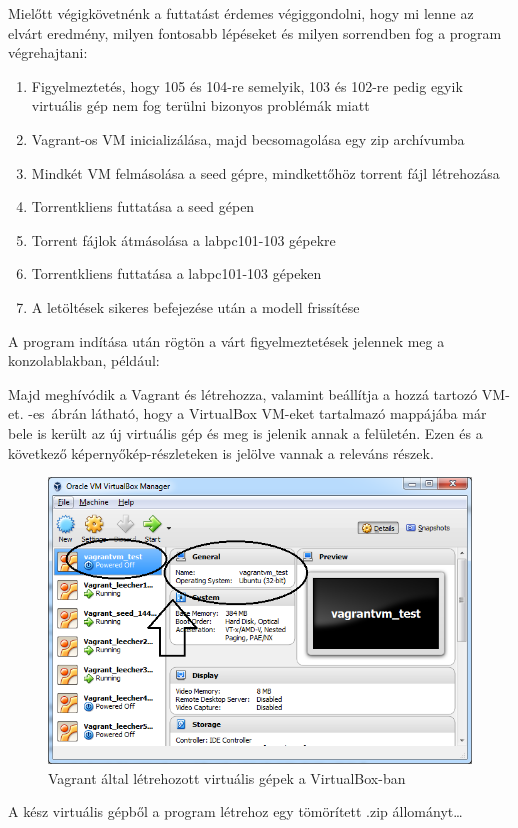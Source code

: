 \FloatBarrier

Mielőtt végigkövetnénk a futtatást érdemes végiggondolni, hogy mi lenne az elvárt eredmény, milyen fontosabb lépéseket és milyen sorrendben fog a program végrehajtani:

\begin{enumerate}
  \item Figyelmeztetés, hogy 105 és 104-re semelyik, 103 és 102-re pedig egyik virtuális gép nem fog terülni bizonyos problémák miatt
  \item Vagrant-os VM inicializálása, majd becsomagolása egy zip archívumba
  \item Mindkét VM felmásolása a seed gépre, mindkettőhöz torrent fájl létrehozása
  \item Torrentkliens futtatása a seed gépen
  \item Torrent fájlok átmásolása a labpc101-103 gépekre
  \item Torrentkliens futtatása a labpc101-103 gépeken
  \item A letöltések sikeres befejezése után a modell frissítése
\end{enumerate}

A program indítása után rögtön a várt figyelmeztetések jelennek meg a konzolablakban, például:


Majd meghívódik a Vagrant és létrehozza, valamint beállítja a hozzá tartozó VM-et. -es~ábrán látható, hogy a VirtualBox VM-eket tartalmazó mappájába már bele is került az új virtuális gép és meg is jelenik annak a felületén. Ezen és a következő képernyőkép-részleteken is jelölve vannak a releváns részek.

\begin{figure}[ht]
\centering
\includegraphics[width=140mm, keepaspectratio]{figures/test_vbox.png}
\caption{Vagrant által létrehozott virtuális gépek a VirtualBox-ban}
\label{fig:vboxcap}
\end{figure}
A kész virtuális gépből a program létrehoz egy tömörített .zip állományt\ldots

